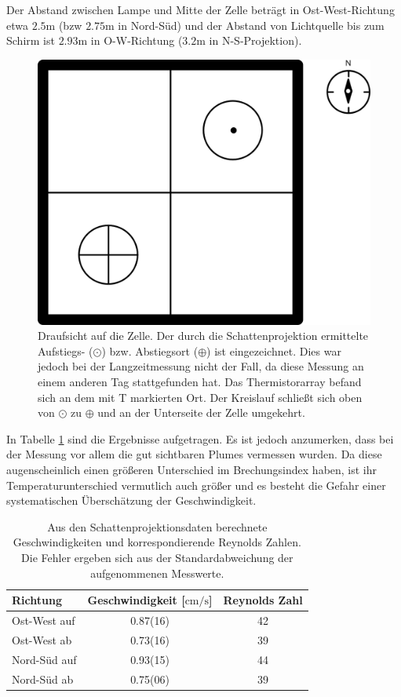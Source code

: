 \documentclass[12pt,a4paper,titlepage,headinclude]{scrartcl}
\numberwithin{equation}{subsection}
\begin{document}
Der Abstand zwischen Lampe und Mitte der Zelle beträgt in Ost-West-Richtung etwa $2.5\si\meter$ (bzw $2.75\si\meter$ in Nord-Süd) und der Abstand von Lichtquelle bis zum Schirm ist $2.93\si\meter$ in O-W-Richtung ($3.2\si\meter$ in N-S-Projektion).
\begin{figure}[h]
	\centering
	\includegraphics[width=0.6\linewidth]{konvektion_skizze}
	\caption{Draufsicht auf die Zelle. Der durch die Schattenprojektion ermittelte Aufstiegs- ($\odot$) bzw. Abstiegsort ($\oplus$) ist eingezeichnet. Dies war jedoch bei der Langzeitmessung nicht der Fall, da diese Messung an einem anderen Tag stattgefunden hat. Das Thermistorarray befand sich an dem mit \textsf T markierten Ort. Der Kreislauf schließt sich oben von $\odot$ zu $\oplus$ und an der Unterseite der Zelle umgekehrt.}
	\label{fig:konvektion}
\end{figure}
In Tabelle \ref{tab:schatten} sind die Ergebnisse aufgetragen.
Es ist jedoch anzumerken, dass bei der Messung vor allem die gut sichtbaren Plumes vermessen wurden.
Da diese augenscheinlich einen größeren Unterschied im Brechungsindex haben, ist ihr Temperaturunterschied vermutlich auch größer und es besteht die Gefahr einer systematischen Überschätzung der Geschwindigkeit.
\begin{table}[h]
	\centering
	\begin{tabular}{|l|cc|}
                \hline Richtung     & Geschwindigkeit [$\si{\centi\meter\per\second}$] & Reynolds Zahl\\\hline
		Ost-West auf        & 0.87(16)                                         & 42\\
		Ost-West ab         & 0.73(16)                                         & 39\\
		Nord-Süd auf        & 0.93(15)                                         & 44\\
		Nord-Süd ab         & 0.75(06)                                         & 39\\\hline
	\end{tabular}
	\caption{Aus den Schattenprojektionsdaten berechnete Geschwindigkeiten und korrespondierende Reynolds Zahlen. Die Fehler ergeben sich aus der Standardabweichung der aufgenommenen Messwerte.}
	\label{tab:schatten}
\end{table}
\end{document}
